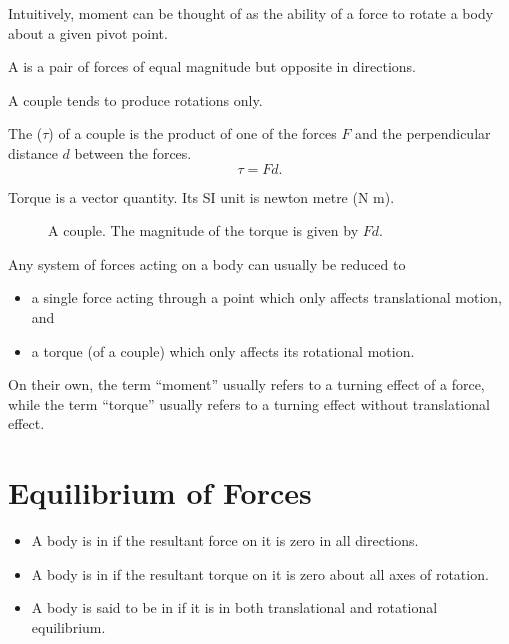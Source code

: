 Intuitively, moment can be thought of as the ability of a force to rotate a body about a given pivot point.

\begin{definition}
    A  is a pair of forces of equal magnitude but opposite in directions.
\end{definition}

A couple tends to produce rotations only.

\begin{definition}
    The  ($\tau$) of a couple is the product of one of the forces $F$ and the perpendicular distance $d$ between the forces. \[\tau = F d.\]
\end{definition}

Torque is a vector quantity. Its SI unit is newton metre (N m).

\begin{figure}[H]
    \centering
    \caption{A couple. The magnitude of the torque is given by $Fd$.}
\end{figure}

Any system of forces acting on a body can usually be reduced to
\begin{itemize}
    \item a single force acting through a point which only affects translational motion, and
    \item a torque (of a couple) which only affects its rotational motion.
\end{itemize}

On their own, the term ``moment'' usually refers to a turning effect of a force, while the term ``torque'' usually refers to a turning effect without translational effect.

\section{Equilibrium of Forces}

\begin{definition}
    \phantom{.}
    \begin{itemize}
        \item A body is in  if the resultant force on it is zero in all directions.
        \item A body is in  if the resultant torque on it is zero about all axes of rotation.
        \item A body is said to be in  if it is in both translational and rotational equilibrium.
    \end{itemize}
\end{definition}


